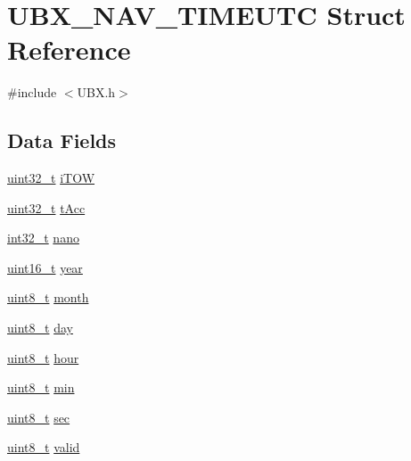 \hypertarget{struct_u_b_x___n_a_v___t_i_m_e_u_t_c}{\section{U\-B\-X\-\_\-\-N\-A\-V\-\_\-\-T\-I\-M\-E\-U\-T\-C Struct Reference}
\label{struct_u_b_x___n_a_v___t_i_m_e_u_t_c}
}


{\ttfamily \#include $<$U\-B\-X.\-h$>$}

\subsection*{Data Fields}
\begin{DoxyCompactItemize}
\item 
\hyperlink{stdint_8h_a435d1572bf3f880d55459d9805097f62}{uint32\-\_\-t} \hyperlink{group___g_s_p_module_gad71c5daaee202e2453fd942712b931d8}{i\-T\-O\-W}
\item 
\hyperlink{stdint_8h_a435d1572bf3f880d55459d9805097f62}{uint32\-\_\-t} \hyperlink{group___g_s_p_module_gadb8a5ad986f11644415dc969c0803cc9}{t\-Acc}
\item 
\hyperlink{group___n_a_m_e_gafd12020da5a235dfcf0c3c748fb5baed}{int32\-\_\-t} \hyperlink{group___g_s_p_module_ga2d187aede7b05688f29eacfd6bd57ecc}{nano}
\item 
\hyperlink{stdint_8h_a273cf69d639a59973b6019625df33e30}{uint16\-\_\-t} \hyperlink{group___g_s_p_module_ga8ea81fa402795b3daf6ec8bcc9c51eb1}{year}
\item 
\hyperlink{stdint_8h_aba7bc1797add20fe3efdf37ced1182c5}{uint8\-\_\-t} \hyperlink{group___g_s_p_module_gafd4af98336281bae2375714238392070}{month}
\item 
\hyperlink{stdint_8h_aba7bc1797add20fe3efdf37ced1182c5}{uint8\-\_\-t} \hyperlink{group___g_s_p_module_gaf47b128d3c65964f825c689849546c6d}{day}
\item 
\hyperlink{stdint_8h_aba7bc1797add20fe3efdf37ced1182c5}{uint8\-\_\-t} \hyperlink{group___g_s_p_module_ga6685b128ba202f68bbba28ce3877d496}{hour}
\item 
\hyperlink{stdint_8h_aba7bc1797add20fe3efdf37ced1182c5}{uint8\-\_\-t} \hyperlink{group___g_s_p_module_gacd6195ae28168d6d82b8944dd362a976}{min}
\item 
\hyperlink{stdint_8h_aba7bc1797add20fe3efdf37ced1182c5}{uint8\-\_\-t} \hyperlink{group___g_s_p_module_gadf8744b17bc7095cc06d9f0909bd865d}{sec}
\item 
\hyperlink{stdint_8h_aba7bc1797add20fe3efdf37ced1182c5}{uint8\-\_\-t} \hyperlink{group___g_s_p_module_ga7709acce4beceb6a24a8f239923fb026}{valid}
\end{DoxyCompactItemize}


